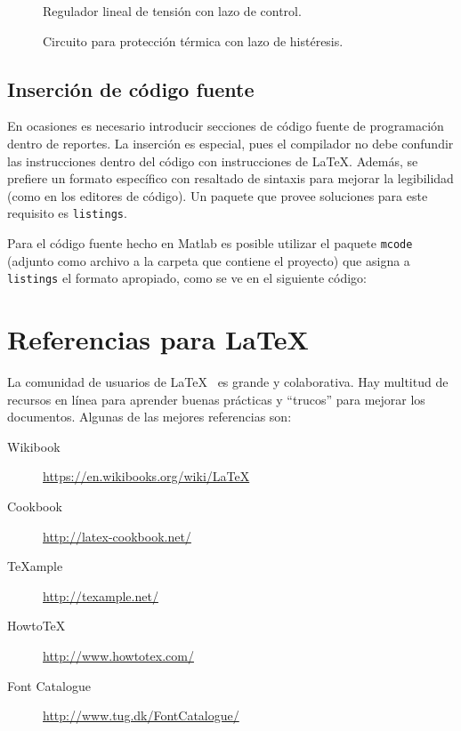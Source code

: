 \documentclass[12pt,letterpaper]{article}
\begin{document}
\begin{figure}[H]
\centering

\caption{Regulador lineal de tensión con lazo de control.}
\label{F:reguladorlineal}
\end{figure}

\begin{figure}[H]
\centering

\caption{Circuito para protección térmica con lazo de histéresis.}
\label{F:protecciontermica}
\end{figure}

\subsection{Inserción de código fuente}

En ocasiones es necesario introducir secciones de código fuente de programación dentro de reportes. La inserción es especial, pues el compilador no debe confundir las instrucciones dentro del código con instrucciones de \LaTeX. Además, se prefiere un formato específico con resaltado de sintaxis para mejorar la legibilidad (como en los editores de código). Un paquete que provee soluciones para este requisito es \texttt{listings}.

Para el código fuente hecho en Matlab es posible utilizar el paquete \texttt{mcode} (adjunto como archivo a la carpeta que contiene el proyecto) que asigna a \texttt{listings} el formato apropiado, como se ve en el siguiente código:



\section{Referencias para \LaTeX}

La comunidad de usuarios de \LaTeX~ es grande y colaborativa. Hay multitud de recursos en línea para aprender buenas prácticas y ``trucos'' para mejorar los documentos. Algunas de las mejores referencias son:

\begin{description}
\item[Wikibook] \url{https://en.wikibooks.org/wiki/LaTeX}
\item[Cookbook] \url{http://latex-cookbook.net/}
\item[TeXample] \url{http://texample.net/}
\item[HowtoTeX] \url{http://www.howtotex.com/}
\item[Font Catalogue] \url{http://www.tug.dk/FontCatalogue/}
\end{description}
\end{document}
